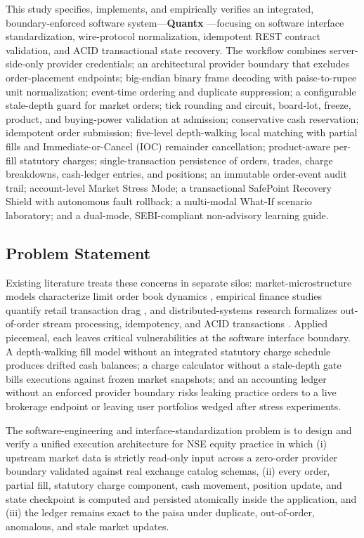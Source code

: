 \documentclass[12pt]{article}
\begin{document}
This study specifies, implements, and empirically verifies an integrated, boundary-enforced software system—\textbf{Quantx} \cite{quantx_software}—focusing on software interface standardization, wire-protocol normalization, idempotent REST contract validation, and ACID transactional state recovery. The workflow combines server-side-only provider credentials; an architectural provider boundary that excludes order-placement endpoints; big-endian binary frame decoding with paise-to-rupee unit normalization; event-time ordering and duplicate suppression; a configurable stale-depth guard for market orders; tick rounding and circuit, board-lot, freeze, product, and buying-power validation at admission; conservative cash reservation; idempotent order submission; five-level depth-walking local matching with partial fills and Immediate-or-Cancel (IOC) remainder cancellation; product-aware per-fill statutory charges; single-transaction persistence of orders, trades, charge breakdowns, cash-ledger entries, and positions; an immutable order-event audit trail; account-level Market Stress Mode; a transactional SafePoint Recovery Shield with autonomous fault rollback; a multi-modal What-If scenario laboratory; and a dual-mode, SEBI-compliant non-advisory learning guide.

\subsection{Problem Statement}
Existing literature treats these concerns in separate silos: market-microstructure models characterize limit order book dynamics \cite{gould2013,cont2010}, empirical finance studies quantify retail transaction drag \cite{barber2009,sebi2023}, and distributed-systems research formalizes out-of-order stream processing, idempotency, and ACID transactions \cite{akidau2015,helland2012,gray1993}. Applied piecemeal, each leaves critical vulnerabilities at the software interface boundary. A depth-walking fill model without an integrated statutory charge schedule produces drifted cash balances; a charge calculator without a stale-depth gate bills executions against frozen market snapshots; and an accounting ledger without an enforced provider boundary risks leaking practice orders to a live brokerage endpoint or leaving user portfolios wedged after stress experiments.

The software-engineering and interface-standardization problem is to design and verify a unified execution architecture for NSE equity practice in which (i) upstream market data is strictly read-only input across a zero-order provider boundary validated against real exchange catalog schemas, (ii) every order, partial fill, statutory charge component, cash movement, position update, and state checkpoint is computed and persisted atomically inside the application, and (iii) the ledger remains exact to the paisa under duplicate, out-of-order, anomalous, and stale market updates.
\end{document}

